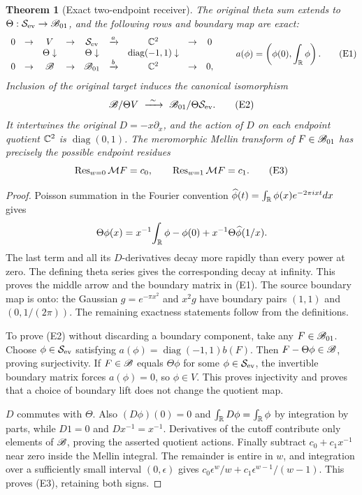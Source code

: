 \documentclass[11pt]{article}
\newtheorem{theorem}{Theorem}[section]
\begin{document}
\begin{theorem}[Exact two-endpoint receiver]\label{thm:two-endpoints}
The original theta sum extends to $\Theta:\mathcal S_{\rm ev}\to\mathscr B_{01}$,
and the following rows and boundary map are exact:
\[
 \begin{array}{ccccccccc}
 0&\to& V&\to&\mathcal S_{\rm ev}&\xrightarrow{a}&\mathbb C^2&\to&0\\
 &&\Theta\downarrow&&\Theta\downarrow&&\operatorname{diag}(-1,1)\downarrow\\
 0&\to&\mathscr B&\to&\mathscr B_{01}&\xrightarrow{b}&\mathbb C^2&\to&0,
 \end{array}
 \qquad a(\phi)=\left(\phi(0),\int_\mathbb R\phi\right).
 \tag{E1}
\]
Inclusion of the original target induces the canonical isomorphism
\[
 \B/\Theta V\ \xrightarrow{\ \sim\ }\
 \B_{01}/\Theta\mathcal S_{\rm ev}.\tag{E2}
\]
It intertwines the original $D=-x\partial_x$, and the action of $D$ on
each endpoint quotient $\mathbb C^2$ is $\operatorname{diag}(0,1)$.
The meromorphic Mellin transform of $F\in\mathscr B_{01}$ has precisely the
possible endpoint residues
\[
 \operatorname{Res}_{w=0}\mathcal M F=c_0,\qquad
 \operatorname{Res}_{w=1}\mathcal M F=c_1.\tag{E3}
\]
\end{theorem}
\begin{proof}
Poisson summation in the Fourier convention
$\widehat\phi(t)=\int_\mathbb R\phi(x)e^{-2\pi ixt}dx$ gives
\[
 \Theta\phi(x)=x^{-1}\!\int_\mathbb R\phi-\phi(0)
                         +x^{-1}\Theta\widehat\phi(1/x).
\]
The last term and all its $D$-derivatives decay more rapidly than every
power at zero. The defining theta series gives the corresponding decay
at infinity. This proves the middle arrow and the boundary matrix in
(E1). The source boundary map is onto: the Gaussian $g=e^{-\pi x^2}$
and $x^2g$ have boundary pairs $(1,1)$ and $(0,1/(2\pi))$.
The remaining exactness statements follow from the definitions.

To prove (E2) without discarding a boundary component, take any
$F\in\mathscr B_{01}$. Choose $\phi\in\mathcal S_{\rm ev}$ satisfying
$a(\phi)=\operatorname{diag}(-1,1)b(F)$. Then $F-\Theta\phi\in\mathscr B$,
proving surjectivity. If $F\in\mathscr B$ equals $\Theta\phi$ for some
$\phi\in\mathcal S_{\rm ev}$, the invertible boundary matrix forces
$a(\phi)=0$, so $\phi\in V$. This proves injectivity and proves
that a choice of boundary lift does not change the quotient map.

$D$ commutes with $\Theta$. Also $(D\phi)(0)=0$ and
$\int_\mathbb R D\phi=\int_\mathbb R\phi$ by integration by parts, while
$D1=0$ and $Dx^{-1}=x^{-1}$. Derivatives of the cutoff contribute
only elements of $\mathscr B$, proving the asserted quotient actions.
Finally subtract $c_0+c_1x^{-1}$ near zero inside the Mellin integral.
The remainder is entire in $w$, and integration over a sufficiently
small interval $(0,\epsilon)$ gives
$c_0\epsilon^w/w+c_1\epsilon^{w-1}/(w-1)$.
This proves (E3), retaining both signs.
\end{proof}
\end{document}
